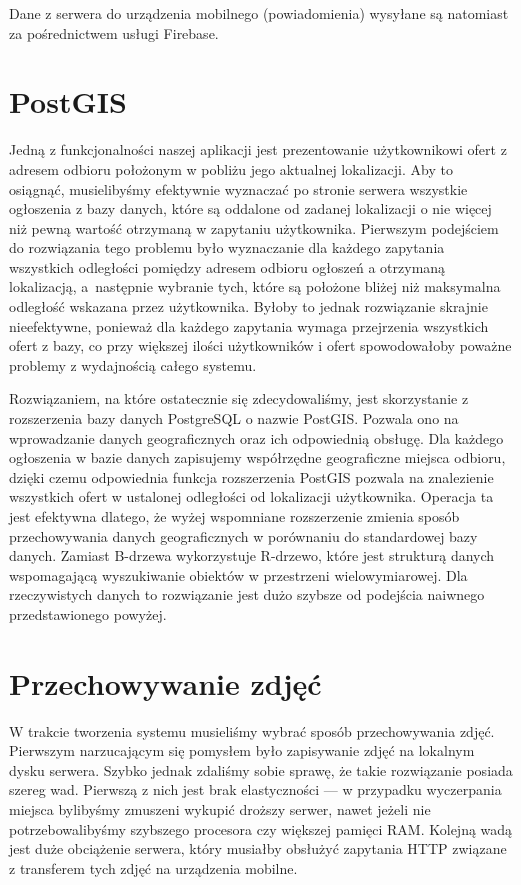 \documentclass[licencjacka]{pracamgr}
\begin{document}
Dane z serwera do urządzenia mobilnego (powiadomienia) wysyłane są natomiast za pośrednictwem usługi Firebase.

\section{PostGIS}
Jedną z funkcjonalności naszej aplikacji jest prezentowanie użytkownikowi ofert z adresem odbioru położonym w pobliżu jego aktualnej lokalizacji. Aby to osiągnąć, musielibyśmy efektywnie wyznaczać po stronie serwera wszystkie ogłoszenia z bazy danych, które są oddalone od zadanej lokalizacji o nie więcej niż pewną wartość otrzymaną w zapytaniu użytkownika. Pierwszym podejściem do rozwiązania tego problemu było wyznaczanie dla każdego zapytania wszystkich odległości pomiędzy adresem odbioru ogłoszeń a otrzymaną lokalizacją, a~następnie wybranie tych, które są położone bliżej niż maksymalna odległość wskazana przez użytkownika. Byłoby to jednak rozwiązanie skrajnie nieefektywne, ponieważ dla każdego zapytania wymaga przejrzenia wszystkich ofert z bazy, co przy większej ilości użytkowników i ofert spowodowałoby poważne problemy z wydajnością całego systemu.

Rozwiązaniem, na które ostatecznie się zdecydowaliśmy, jest skorzystanie z rozszerzenia bazy danych PostgreSQL o nazwie PostGIS\@. Pozwala ono na wprowadzanie danych geograficznych oraz ich odpowiednią obsługę. Dla każdego ogłoszenia w bazie danych zapisujemy współrzędne geograficzne miejsca odbioru, dzięki czemu odpowiednia funkcja rozszerzenia PostGIS pozwala na znalezienie wszystkich ofert w ustalonej odległości od lokalizacji użytkownika. Operacja ta jest efektywna dlatego, że wyżej wspomniane rozszerzenie zmienia sposób przechowywania danych geograficznych w porównaniu do standardowej bazy danych. Zamiast B-drzewa wykorzystuje R-drzewo, które jest strukturą danych wspomagającą wyszukiwanie obiektów w przestrzeni wielowymiarowej. Dla rzeczywistych danych to rozwiązanie jest dużo szybsze od podejścia naiwnego przedstawionego powyżej.

\section{Przechowywanie zdjęć}

W trakcie tworzenia systemu musieliśmy wybrać sposób przechowywania zdjęć. Pierwszym narzucającym się pomysłem było zapisywanie zdjęć na lokalnym dysku serwera. Szybko jednak zdaliśmy sobie sprawę, że takie rozwiązanie posiada szereg wad.
Pierwszą z nich jest brak elastyczności --- w przypadku wyczerpania miejsca bylibyśmy zmuszeni wykupić droższy serwer, nawet jeżeli nie potrzebowalibyśmy szybszego procesora czy większej pamięci RAM. Kolejną wadą jest duże obciążenie serwera, który musiałby obsłużyć zapytania HTTP związane z transferem tych zdjęć na urządzenia mobilne.
\end{document}
